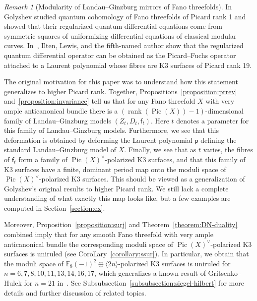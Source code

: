 \documentclass[10pt]{amsart}
\numberwithin{equation}{section}
\theoremstyle{plain}
\theoremstyle{definition}
\theoremstyle{remark}
\newtheorem{remark}[theorem]{Remark}
\DeclareMathOperator{\Pic}{Pic}
\DeclareMathOperator{\rk}{rank}
\begin{document}
\begin{remark}[Modularity of Landau--Ginzburg mirrors of Fano threefolds]
  In~\cite{golyshev2004modularity,golyshev2007classification} Golyshev studied quantum cohomology of Fano threefolds of Picard rank 1 and showed that their regularized quantum differential equations come from symmetric squares of uniformizing differential equations of classical modular curves. In~\cite{ilten2013toric}, Ilten, Lewis, and the fifth-named author show that the regularized quantum differential operator can be obtained as the Picard--Fuchs operator attached to a Laurent polynomial whose fibres are K3 surfaces of Picard rank 19.

  The original motivation for this paper was to understand how this statement generalizes to higher Picard rank. Together, Propositions~\ref{proposition:prrev} and~\ref{proposition:invariance} tell us that for any Fano threefold \(X\) with very ample anticanonical bundle there is a \((\rk(\Pic(X)) -1)\)-dimensional family of Landau--Ginzburg models \((Z_t,D_t,\mathsf{f}_t)\). Here \(t\) denotes a parameter for this family of Landau--Ginzburg models. Furthermore, we see that this deformation is obtained by deforming the Laurent polynomial \(\mathsf{p}\) defining the standard Landau--Ginzburg model of \(X\). Finally, we see that as \(t\) varies, the fibres of \(\mathsf{f}_t\) form a family of \(\Pic(X)^\vee\)-polarized K3 surfaces, and that this family of K3 surfaces have a finite, dominant period map onto the moduli space of \(\Pic(X)^\vee\)-polarized K3 surfaces. This should be viewed as a generalization of Golyshev's original results to higher Picard rank. We still lack a complete understanding of what exactly this map looks like, but a few examples are computed in Section~\ref{section:ex}.

  Moreover, Proposition~\ref{proposition:surj} and Theorem~\ref{theorem:DN-duality} combined imply that for any smooth Fano threefold with very ample anticanonical bundle the corresponding moduli space of \(\Pic(X)^{\vee}\)-polarized K3 surfaces is uniruled (see Corollary~\ref{corollary:ssur}). In particular, we obtain that the moduli space of \(\mathbb{E}_8(-1)^2 \oplus \langle 2n \rangle\)-polarized K3 surfaces is uniruled for \(n = 6,7,8,10,11,13,14,16,17\), which generalizes a known result of Gritsenko--Hulek for \(n = 21\) in~\cite{gritsenko1998minimal}. See Subsubsection~\ref{subsubsection:siegel-hilbert} for more details and further discussion of related topics.
\end{remark}
\end{document}
